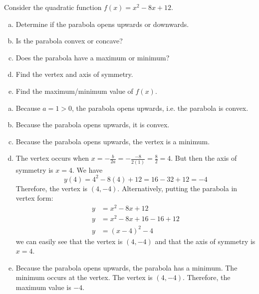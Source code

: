 \documentclass[11pt,letterpaper]{article}
\begin{document}
\newpage





 Consider the quadratic function $f(x)= x^2 - 8x + 12$.
\begin{enumerate}[(a)]
\item Determine if the parabola opens upwards or downwards.
\item Is the parabola convex or concave?
\item Does the parabola have a maximum or minimum? 
\item Find the vertex and axis of symmetry. 
\item Find the maximum/minimum value of $f(x)$. 
\end{enumerate} \pspace

\sol
\begin{enumerate}[(a)]
\item Because $a= 1 > 0$, the parabola opens upwards, i.e. the parabola is convex. \pspace

\item Because the parabola opens upwards, it is convex. \pspace

\item Because the parabola opens upwards, the vertex is a minimum. \pspace

\item The vertex occurs when $x= -\frac{b}{2a}= -\frac{-8}{2(1)}= \frac{8}{2}= 4$. But then the axis of symmetry is $x= 4$. We have
	\[
	y(4)= 4^2 - 8(4) + 12= 16 - 32 + 12= -4
	\]
Therefore, the vertex is $(4, -4)$. Alternatively, putting the parabola in vertex form:
	\[
	\begin{aligned}
	y&= x^2 - 8x + 12 \\[0.3cm]
	y&= x^2 - 8x + 16 - 16 + 12 \\[0.3cm]
	y&= (x - 4)^2 - 4
	\end{aligned}
	\]
we can easily see that the vertex is $(4, -4)$ and that the axis of symmetry is $x= 4$. \pspace

\item Because the parabola opens upwards, the parabola has a minimum. The minimum occurs at the vertex. The vertex is $(4, -4)$. Therefore, the maximum value is $-4$. 
\end{enumerate}





\newpage
\end{document}
